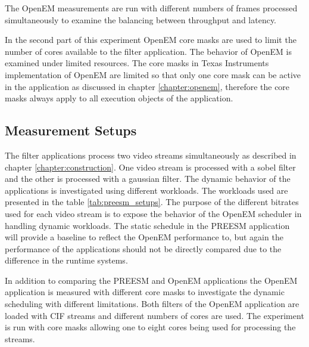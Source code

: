  The OpenEM measurements are
run with different numbers of frames processed simultaneously to examine the
balancing between throughput and latency.

In the second part of this experiment OpenEM core masks are used to limit the
number of cores available to the filter application. The behavior of OpenEM is
examined under limited resources. The core masks in Texas Instruments
implementation of OpenEM are limited so that only one core mask can be active in
the application as discussed in chapter \ref{chapter:openem}, therefore the core
masks always apply to all execution objects of the application. 

\subsection{Measurement Setups}
The filter applications process two video streams simultaneously as described in
chapter \ref{chapter:construction}. One video stream is processed with a sobel
filter and the other is processed with a gaussian filter. The dynamic behavior
of the applications is investigated using different workloads. The workloads
used are presented in the table \ref{tab:preesm_setups}. The purpose of the
different bitrates used for each video stream is to expose the behavior of the
OpenEM scheduler in handling dynamic workloads. The static schedule in the
PREESM application will provide a baseline to reflect the OpenEM performance to,
but again the performance of the applications should not be directly compared
due to the difference in the runtime systems.

In addition to comparing the PREESM and OpenEM applications the OpenEM
application is measured with different core masks to investigate the dynamic
scheduling with different limitations. Both filters of the OpenEM application
are loaded with CIF streams and different numbers of cores are used. The
experiment is run with core masks allowing one to eight cores being used for
processing the streams.


